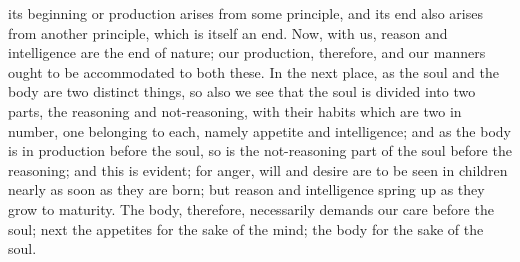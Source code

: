 its beginning or production arises from some principle, and its end also
arises from another principle, which is itself an end. Now, with us,
reason and intelligence are the end of nature; our production, therefore,
and our manners ought to be accommodated to both these. In the next place,
as the soul and the body are two distinct things, so also we see that the
soul is divided into two parts, the reasoning and not-reasoning, with
their habits which are two in number, one belonging to each, namely
appetite and intelligence; and as the body is in production before the
soul, so is the not-reasoning part of the soul before the reasoning; and
this is evident; for anger, will and desire are to be seen in children
nearly as soon as they are born; but reason and intelligence spring up as
they grow to maturity. The body, therefore, necessarily demands our care
before the soul; next the appetites for the sake of the mind; the body for
the sake of the soul.


